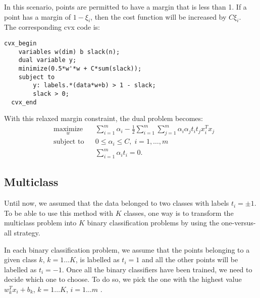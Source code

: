 In this scenario, points are permitted to have a margin that is less than 1. If a point has a margin of $1 - \xi_i$, then the cost function will be increased by $C\xi_i$. 
\\The corresponding cvx code is:
\begin{verbatim}
cvx_begin
    variables w(dim) b slack(n);
    dual variable y;
    minimize(0.5*w'*w + C*sum(slack));
    subject to 
  	    y: labels.*(data*w+b) > 1 - slack; 
        slack > 0;
  cvx_end
\end{verbatim}
With this relaxed margin constraint, the dual problem becomes:
\begin{equation}
\begin{aligned}
& \underset{w}{\text{maximize}}
& & \sum\limits_{i=1}^m \alpha_i - \frac{1}{2} \sum\limits_{i=1}^m \sum\limits_{j=1}^m \alpha_i \alpha_j t_i t_j x_i^T x_j \\
& \text{subject to}
& & 0 \leq \alpha_i \leq C, \; i = 1, \ldots, m \\
& & & \sum\limits_{i=1}^m \alpha_i t_i = 0.
\end{aligned}
\end{equation}

\subsection{Multiclass}
Until now, we assumed that the data belonged to two classes with labels $t_i=\pm1$. To be able to use this method with $K$ classes, one way is to transform the multiclass problem into  $K$ binary classification problems by using the one-versus-all strategy. 

In each binary classification problem, we assume that the points belonging to a given class $k$, $k=1\ldots K$, is labelled as $t_i=1$ and all the other points will be labelled as $t_i=-1$. Once all the binary classifiers have been trained, we need to decide which one to choose. To do so, we pick the one with the highest value $w_k^Tx_i+b_k$, $k=1\ldots K$, $i=1\ldots m$ . 